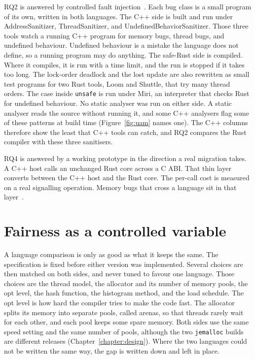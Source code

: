 \documentclass[english,oneside,a4paper,censored,csm,software-track-2020]{HYthesisML}
\begin{document}
RQ2 is answered by controlled fault injection~\cite{natella2016fault}. Each
bug class is a small program of its own, written in both languages. The C++
side is built and run under AddressSanitizer, ThreadSanitizer, and
UndefinedBehaviorSanitizer. Those three tools watch a running C++ program
for memory bugs, thread bugs, and undefined behaviour. Undefined behaviour
is a mistake the language does not define, so a running program may do
anything. The safe-Rust side is compiled. Where it compiles, it is run with
a time limit, and the run is stopped if it takes too long. The lock-order
deadlock and the lost update are also rewritten as small test programs for
two Rust tools, Loom and Shuttle, that try many thread orders. The case
inside \texttt{unsafe} is run under Miri, an interpreter that checks Rust for
undefined behaviour.
No static analyser was run on either side. A static
analyser reads the source without running it, and some C++ analysers flag
some of these patterns at build time (Figure~\ref{fig:uam} names one). The
C++ columns therefore show the least that C++ tools can catch, and RQ2
compares the Rust compiler with these three sanitisers.

RQ4 is answered by a working
prototype in the direction a real migration takes. A C++ host calls an
unchanged Rust core across a C ABI. That thin layer converts between the C++ host and the Rust core.
The per-call cost is measured on a real
signalling operation. Memory bugs that cross a
language sit in that layer~\cite{li2022crosslang}.

\section{Fairness as a controlled variable}\label{sec:controlsbrief}
A language comparison is only as good as what it keeps the same. The specification
is fixed before either version was implemented. Several choices are then matched on
both sides, and never tuned to favour one language. Those choices are the
thread model, the allocator and its number of memory pools, the opt level,
the hash function, the histogram method, and the load schedule. The opt level
is how hard the compiler tries to make the code fast. The allocator splits its
memory into separate pools, called arenas, so that threads rarely wait for each
other, and each pool keeps some spare memory. Both sides use the same speed
setting and the same number of pools, although the two \texttt{jemalloc} builds are different
releases (Chapter~\ref{chapter:design}). Where the two languages could not be
written the same way, the gap is written down and left in place.
\end{document}
